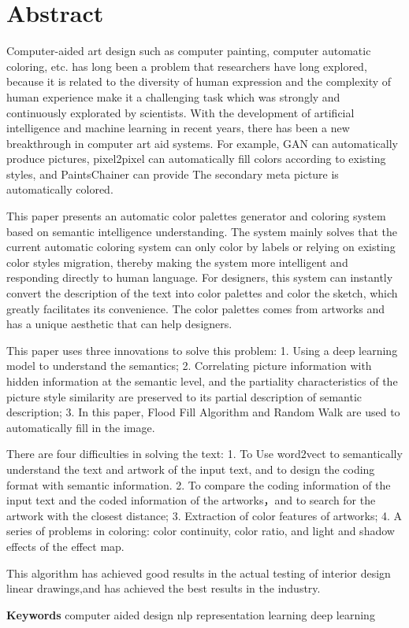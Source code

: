 \chapter{Abstract}

Computer-aided art design such as computer painting, computer automatic coloring, etc. has long been a problem that researchers have long explored, because it is related to the diversity of human expression and the complexity of human experience make it a challenging task which was strongly and continuously explorated by scientists. 
With the development of artificial intelligence and machine learning in recent years, there has been a new breakthrough in computer art aid systems. For example, GAN can automatically produce pictures, pixel2pixel can automatically fill colors according to existing styles, and PaintsChainer can provide The secondary meta picture is automatically colored.

This paper presents an automatic color palettes generator and coloring system based on semantic intelligence understanding. 
The system mainly solves that the current automatic coloring system can only  color by labels or relying on existing color styles migration, thereby making the system more intelligent and responding directly to human language. 
For designers, this system can instantly convert the description of the text into color palettes and color the sketch, which greatly facilitates its convenience. The color palettes comes from artworks and has a unique aesthetic that can help designers.

This paper uses three innovations to solve this problem: 1. Using a deep learning model to understand the semantics; 2. Correlating picture information with hidden information at the semantic level, and the partiality characteristics of the picture style similarity are preserved to its partial description of semantic description; 3. In this paper, Flood Fill Algorithm and Random Walk are used to automatically fill in the image.

There are four difficulties in solving the text: 1. To Use word2vect to semantically understand the text and artwork of the input text, and to design the coding format with semantic information. 2. To compare the coding information of the input text and the coded information of the artworks，and  to search for the artwork with the closest distance; 3. Extraction of color features of artworks; 4. A series of problems in coloring: color continuity, color ratio, and light and shadow effects of the effect map.

This algorithm has achieved good results in the actual testing of interior design linear drawings,and has achieved the best results in the industry.

{
    \vspace{1em}
    \setlength{\parindent}{0em}
    \textbf{Keywords} \; computer aided design  \; nlp\; representation learning \; deep learning \par
}
